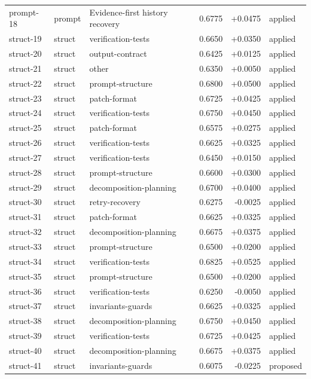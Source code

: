 \begin{center}
\begin{longtable}{llp{5.2cm}rrl}
prompt-18 & prompt & Evidence-first history recovery & 0.6775 & +0.0475 & applied \\
struct-19 & struct & verification-tests & 0.6650 & +0.0350 & applied \\
struct-20 & struct & output-contract & 0.6425 & +0.0125 & applied \\
struct-21 & struct & other & 0.6350 & +0.0050 & applied \\
struct-22 & struct & prompt-structure & 0.6800 & +0.0500 & applied \\
struct-23 & struct & patch-format & 0.6725 & +0.0425 & applied \\
struct-24 & struct & verification-tests & 0.6750 & +0.0450 & applied \\
struct-25 & struct & patch-format & 0.6575 & +0.0275 & applied \\
struct-26 & struct & verification-tests & 0.6625 & +0.0325 & applied \\
struct-27 & struct & verification-tests & 0.6450 & +0.0150 & applied \\
struct-28 & struct & prompt-structure & 0.6600 & +0.0300 & applied \\
struct-29 & struct & decomposition-planning & 0.6700 & +0.0400 & applied \\
struct-30 & struct & retry-recovery & 0.6275 & -0.0025 & applied \\
struct-31 & struct & patch-format & 0.6625 & +0.0325 & applied \\
struct-32 & struct & decomposition-planning & 0.6675 & +0.0375 & applied \\
struct-33 & struct & prompt-structure & 0.6500 & +0.0200 & applied \\
struct-34 & struct & verification-tests & 0.6825 & +0.0525 & applied \\
struct-35 & struct & prompt-structure & 0.6500 & +0.0200 & applied \\
struct-36 & struct & verification-tests & 0.6250 & -0.0050 & applied \\
struct-37 & struct & invariants-guards & 0.6625 & +0.0325 & applied \\
struct-38 & struct & decomposition-planning & 0.6750 & +0.0450 & applied \\
struct-39 & struct & verification-tests & 0.6725 & +0.0425 & applied \\
struct-40 & struct & decomposition-planning & 0.6675 & +0.0375 & applied \\
struct-41 & struct & invariants-guards & 0.6075 & -0.0225 & proposed \\

\end{longtable}
\end{center}

